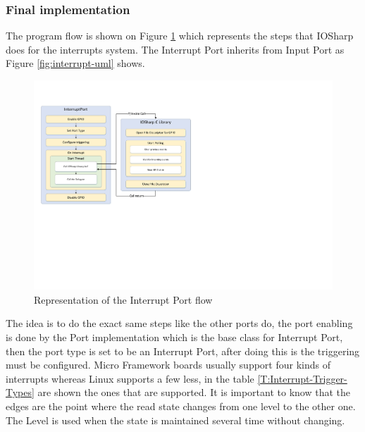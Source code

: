 \subsubsection{Final implementation}\label{SSS:IOSharp-Interrupt-Implementation}
The program flow is shown on Figure \ref{fig:interrupt-schema} which represents the steps that IOSharp does for the interrupts system. The Interrupt Port inherits from Input Port as Figure \ref{fig:interrupt-uml} shows.
\begin{figure}[H]\begin{center}
 \centering
  \captionsetup{justification=centering}
  \includegraphics[width=1\textwidth]{pictures/iosharp/interrupt-schema}
  \caption{Representation of the Interrupt Port flow \label{fig:interrupt-schema}}
\end{center}\end{figure}
The idea is to do the exact same steps like the other ports do, the port enabling is done by the Port implementation which is the base class for Interrupt Port, then the port type is set to be an Interrupt Port, after doing this is the triggering must be configured. Micro Framework boards usually support four kinds of interrupts whereas Linux supports a few less, in the table \ref{T:Interrupt-Trigger-Types} are shown the ones that are supported. It is important to know that the edges are the point where the read state changes from one level to the other one. The Level is used when the state is maintained several time without changing.

